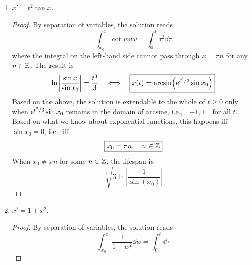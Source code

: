 \documentclass[../psets.tex]{subfiles}
\begin{document}
\begin{enumerate}
\begin{enumerate}
\begin{proof}
\begin{equation*}
            \end{equation*}
            The result is
            \begin{equation*}
                \ln\frac{x}{x_0} = 1-\cos t
                \quad\Longleftrightarrow\quad
                \boxed{x(t) = x_0\e[1-\cos t]}
            \end{equation*}
            The set of $x_0$ for which this solution is extendable to the whole of $t\geq 0$ is $\boxed{\R}$.
        \end{proof}
        \item $x'=t^2\tan x$.
        \begin{proof}
            By separation of variables, the solution reads
            \begin{equation*}
                \int_{x_0}^x\cot w\dd{w} = \int_0^t\tau^2\dd\tau
            \end{equation*}
            where the integral on the left-hand side cannot pass through $x=\pi n$ for any $n\in\Z$. The result is
            \begin{equation*}
                \ln\left| \frac{\sin x}{\sin x_0} \right| = \frac{t^3}{3}
                \quad\Longleftrightarrow\quad
                \boxed{x(t) = \arcsin(\e[t^3/3]\sin x_0)}
            \end{equation*}
            Based on the above, the solution is extendable to the whole of $t\geq 0$ only when $\e[t^3/3]\sin x_0$ remains in the domain of arcsine, i.e., $[-1,1]$ for all $t$. Based on what we know about exponential functions, this happens iff $\sin x_0=0$, i.e., iff
            \begin{equation*}
                \boxed{
                    x_0 = \pi n
                    ,\quad
                    n\in\Z
                }
            \end{equation*}
            When $x_0\neq\pi n$ for some $n\in\Z$, the lifespan is
            \begin{equation*}
                \boxed{\sqrt[3]{3\ln\left| \frac{1}{\sin(x_0)} \right|}}
            \end{equation*}
        \end{proof}
        \item $x'=1+x^2$.
        \begin{proof}
            By separation of variables, the solution reads
            \begin{equation*}
                \int_{x_0}^x\frac{1}{1+w^2}\dd{w} = \int_0^t\dd\tau
            \end{equation*}

\end{proof}
\end{enumerate}
\end{enumerate}
\end{document}
